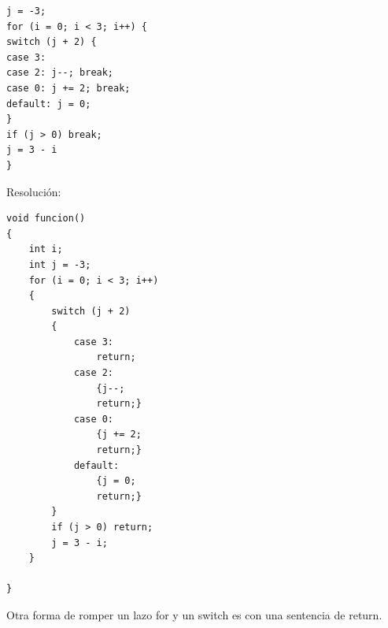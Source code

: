 \documentclass[12pt,oneside]{article}
\begin{document}
\begin{lstlisting}[frame=single]  % Start your code-block
j = -3;
for (i = 0; i < 3; i++) {
switch (j + 2) {
case 3:
case 2: j--; break;
case 0: j += 2; break;
default: j = 0;
}
if (j > 0) break;
j = 3 - i
}
\end{lstlisting}
Resolución:
\begin{lstlisting}[frame=single] 
void funcion()
{
	int i;
	int j = -3;
	for (i = 0; i < 3; i++) 
	{
		switch (j + 2) 
		{
			case 3:
				return;
			case 2: 
				{j--; 
				return;}
			case 0:
				{j += 2; 
				return;}
			default:
				{j = 0;
				return;}
		}
		if (j > 0) return;
		j = 3 - i;
	}
	
}
\end{lstlisting}
Otra forma de romper un lazo for y un switch es con una sentencia de return.
\end{document}
